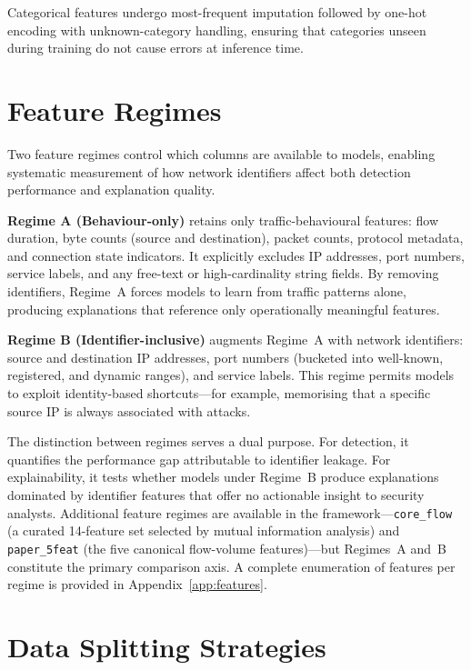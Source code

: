 \documentclass[12pt,a4paper]{report}
\begin{document}
Categorical features undergo most-frequent imputation followed by one-hot encoding with unknown-category handling, ensuring that categories unseen during training do not cause errors at inference time.

\section{Feature Regimes}
\label{sec:regimes}

Two feature regimes control which columns are available to models, enabling systematic measurement of how network identifiers affect both detection performance and explanation quality.

\textbf{Regime A (Behaviour-only)} retains only traffic-behavioural features: flow duration, byte counts (source and destination), packet counts, protocol metadata, and connection state indicators. It explicitly excludes IP addresses, port numbers, service labels, and any free-text or high-cardinality string fields. By removing identifiers, Regime~A forces models to learn from traffic patterns alone, producing explanations that reference only operationally meaningful features.

\textbf{Regime B (Identifier-inclusive)} augments Regime~A with network identifiers: source and destination IP addresses, port numbers (bucketed into well-known, registered, and dynamic ranges), and service labels. This regime permits models to exploit identity-based shortcuts---for example, memorising that a specific source IP is always associated with attacks.

The distinction between regimes serves a dual purpose. For detection, it quantifies the performance gap attributable to identifier leakage. For explainability, it tests whether models under Regime~B produce explanations dominated by identifier features that offer no actionable insight to security analysts. Additional feature regimes are available in the framework---\texttt{core\_flow} (a curated 14-feature set selected by mutual information analysis) and \texttt{paper\_5feat} (the five canonical flow-volume features)---but Regimes~A and~B constitute the primary comparison axis. A complete enumeration of features per regime is provided in Appendix~\ref{app:features}.

\section{Data Splitting Strategies}
\label{sec:splitting}
\end{document}
